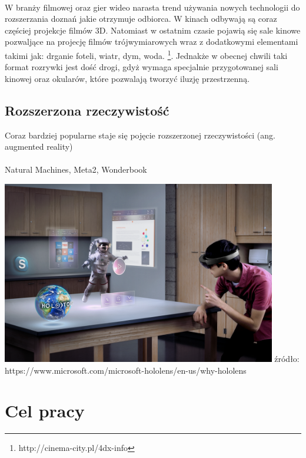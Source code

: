 \documentclass[12pt]{article}
\begin{document}
{{\paragraph{}
W branży filmowej oraz gier wideo narasta trend używania nowych technologii do rozszerzania doznań jakie otrzymuje odbiorca.
W kinach odbywają są coraz częściej projekcje filmów 3D. Natomiast w ostatnim czasie pojawią się sale kinowe pozwaljące  na projecję filmów trójwymiarowych wraz z dodatkowymi elementami takimi jak: drganie foteli, wiatr, dym, woda. \footnote{http://cinema-city.pl/4dx-info}. Jednakże w obecnej chwili taki format rozrywki jest dość drogi, gdyż wymaga specjalnie przygotowanej sali kinowej oraz okularów, które pozwalają tworzyć iluzję przestrzenną. 

\subsection{Rozszerzona rzeczywistość}
Coraz bardziej popularne staje się pojęcie rozszerzonej rzeczywistości (ang. augmented reality)

\paragraph{}
Natural Machines, Meta2, Wonderbook
\begin{center}
\includegraphics[width=0.9\textwidth]{images/hololens.png}
\small {źródło: https://www.microsoft.com/microsoft-hololens/en-us/why-hololens }
\end{center}


\section{Cel pracy}
}}
\end{document}
